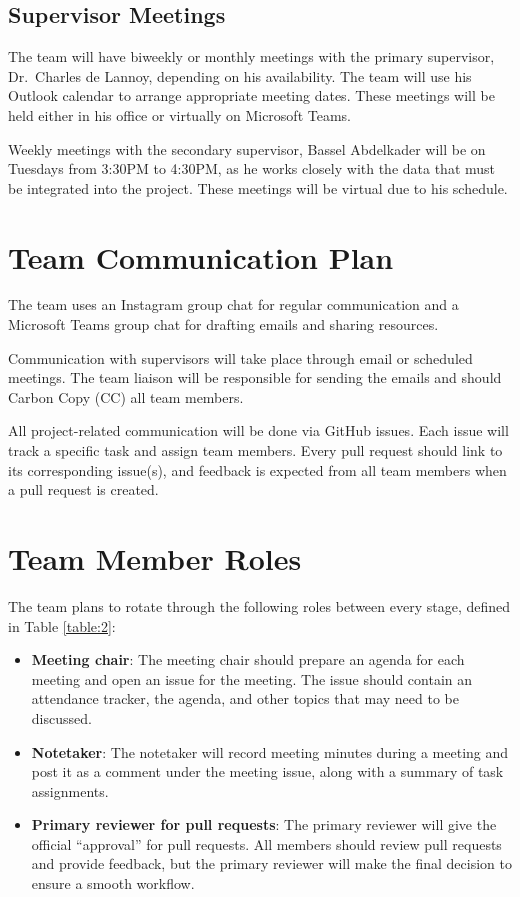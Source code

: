 \documentclass{article}
\begin{document}
\subsection{Supervisor Meetings}
The team will have biweekly or monthly meetings with the primary supervisor,
Dr.\ Charles de Lannoy, depending on his availability. The team will use his
Outlook calendar to arrange appropriate meeting dates. These meetings will be
held either in his office or virtually on Microsoft Teams.\newline

\noindent Weekly meetings with the secondary supervisor, Bassel Abdelkader will
be on Tuesdays from 3:30PM to 4:30PM, as he works closely with the data that
must be integrated into the project. These meetings will be virtual due to his
schedule.

\section{Team Communication Plan}

The team uses an Instagram group chat for regular communication and a Microsoft
Teams group chat for drafting emails and sharing resources.\newline

\noindent Communication with supervisors will take place through email or
scheduled meetings. The team liaison will be responsible for sending the emails
and should Carbon Copy (CC) all team members.\newline

\noindent All project-related communication will be done via GitHub issues. Each
issue will track a specific task and assign team members. Every pull request
should link to its corresponding issue(s), and feedback is expected from all
team members when a pull request is created.

\section{Team Member Roles}

The team plans to rotate through the following roles between every stage,
defined in Table \ref{table:2}:

\begin{itemize}
  \item \textbf{Meeting chair}: The meeting chair should prepare an agenda for
  each meeting and open an issue for the meeting. The issue should contain an
  attendance tracker, the agenda, and other topics that may need to be
  discussed.
  \item \textbf{Notetaker}: The notetaker will record meeting minutes during a
  meeting and post it as a comment under the meeting issue, along with a summary
  of task assignments.
  \item \textbf{Primary reviewer for pull requests}: The primary reviewer will
  give the official ``approval'' for pull requests. All members should review
  pull requests and provide feedback, but the primary reviewer will make the
  final decision to ensure a smooth workflow.
\end{itemize}
\end{document}
